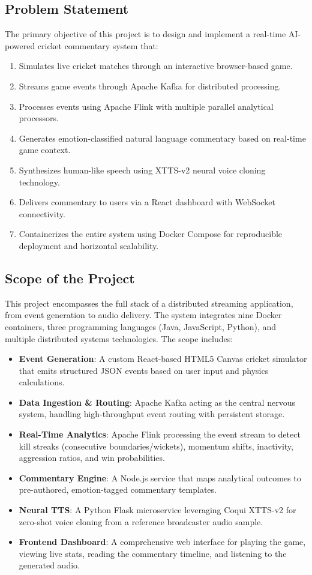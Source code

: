 \subsection{Problem Statement}
The primary objective of this project is to design and implement a real-time AI-powered cricket commentary system that:
\begin{enumerate}
\item Simulates live cricket matches through an interactive browser-based game.
\item Streams game events through Apache Kafka for distributed processing.
\item Processes events using Apache Flink with multiple parallel analytical processors.
\item Generates emotion-classified natural language commentary based on real-time game context.
\item Synthesizes human-like speech using XTTS-v2 neural voice cloning technology.
\item Delivers commentary to users via a React dashboard with WebSocket connectivity.
\item Containerizes the entire system using Docker Compose for reproducible deployment and horizontal scalability.
\end{enumerate}

\subsection{Scope of the Project}
This project encompasses the full stack of a distributed streaming application, from event generation to audio delivery. The system integrates nine Docker containers, three programming languages (Java, JavaScript, Python), and multiple distributed systems technologies. The scope includes:
\begin{itemize}
\item \textbf{Event Generation}: A custom React-based HTML5 Canvas cricket simulator that emits structured JSON events based on user input and physics calculations.
\item \textbf{Data Ingestion \& Routing}: Apache Kafka acting as the central nervous system, handling high-throughput event routing with persistent storage.
\item \textbf{Real-Time Analytics}: Apache Flink processing the event stream to detect kill streaks (consecutive boundaries/wickets), momentum shifts, inactivity, aggression ratios, and win probabilities.
\item \textbf{Commentary Engine}: A Node.js service that maps analytical outcomes to pre-authored, emotion-tagged commentary templates.
\item \textbf{Neural TTS}: A Python Flask microservice leveraging Coqui XTTS-v2 for zero-shot voice cloning from a reference broadcaster audio sample.
\item \textbf{Frontend Dashboard}: A comprehensive web interface for playing the game, viewing live stats, reading the commentary timeline, and listening to the generated audio.
\end{itemize}

